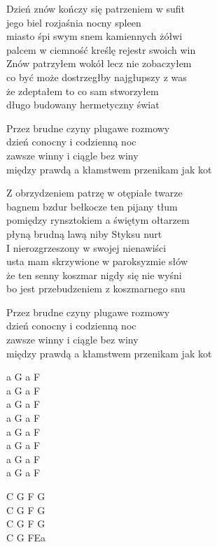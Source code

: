 \begin{text}
    Dzień znów kończy się patrzeniem w sufit\\
    jego biel rozjaśnia nocny spleen\\
    miasto śpi swym snem kamiennych żółwi\\
    palcem w ciemność kreślę rejestr swoich win\\
    Znów patrzyłem wokół lecz nie zobaczyłem\\
    co być może dostrzegłby najgłupszy z was\\
    że zdeptałem to co sam stworzyłem\\
    długo budowany hermetyczny świat

    Przez brudne czyny plugawe rozmowy\\
    dzień conocny i codzienną noc\\
    zawsze winny i ciągle bez winy\\
    między prawdą a kłamstwem przenikam jak kot

    Z obrzydzeniem patrzę w otępiałe twarze\\
    bagnem bzdur bełkocze ten pijany tłum\\
    pomiędzy rynsztokiem a świętym ołtarzem\\
    płyną brudną lawą niby Styksu nurt\\
    I nierozgrzeszony w swojej nienawiści\\
    usta mam skrzywione w paroksyzmie słów\\
    że ten senny koszmar nigdy się nie wyśni\\
    bo jest przebudzeniem z koszmarnego snu

    Przez brudne czyny plugawe rozmowy\\
    dzień conocny i codzienną noc\\
    zawsze winny i ciągle bez winy\\
    między prawdą a kłamstwem przenikam jak kot
\end{text}
\begin{chord}
    a G a F\\
    a G a F\\
    a G a F\\
    a G a F\\
    a G a F\\
    a G a F\\
    a G a F\\
    a G a F

    C G F G\\
    C G F G\\
    C G F G\\
    C G FEa
\end{chord}